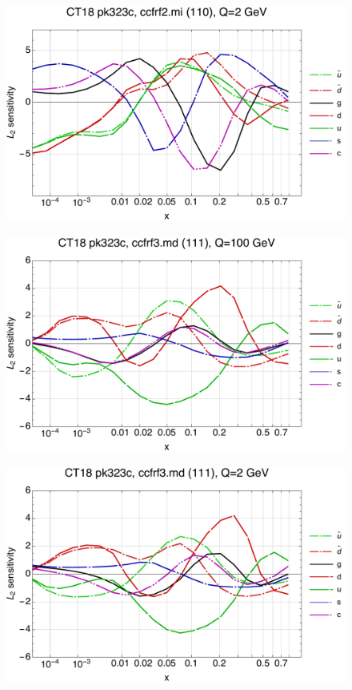 \documentclass[10pt,aps,prd,floatfix,titlepage]{revtex4}
\begin{document}
\begin{figure}
\includegraphics[width=\textwidth,height=0.44\textheight,keepaspectratio]{1/110_ct18nn_L2_q2_Sf_1.pdf}
\caption{}
\end{figure}
\clearpage
\begin{figure}
\includegraphics[width=\textwidth,height=0.44\textheight,keepaspectratio]{1/111_ct18nn_L2_q100_Sf_1.pdf}
\caption{}
\end{figure}
\begin{figure}
\includegraphics[width=\textwidth,height=0.44\textheight,keepaspectratio]{1/111_ct18nn_L2_q2_Sf_1.pdf}
\caption{}
\end{figure}
\end{document}
